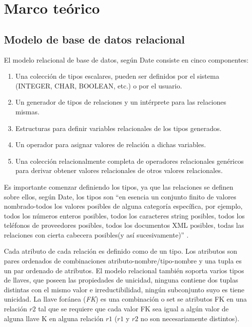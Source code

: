 \documentclass[letterpaper]{article}
\begin{document}
\section {Marco teórico}
\subsection {Modelo de base de datos relacional}
El modelo relacional de base de datos, según Date  consiste en cinco componentes:
\begin{enumerate}
    \item Una colección de tipos escalares, pueden ser definidos por el sistema (INTEGER, CHAR, BOOLEAN, etc.) o por el usuario.
    \item Un generador de tipos de relaciones y un intérprete para las relaciones mismas.
    \item Estructuras para definir variables relacionales de los tipos generados.
    \item Un operador para asignar valores de relación a dichas variables.
    \item Una colección relacionalmente completa de operadores relacionales genéricos para derivar obtener valores relacionales de otros valores relacionales.
\end{enumerate}
Es importante comenzar definiendo los tipos, ya que las relaciones se definen sobre ellos, según Date, los tipos son ``en esencia un conjunto finito de valores nombrado-todos los valores posibles de alguna categoría específica, por ejemplo, todos los números enteros posibles, todos los caracteres string posibles, todos los teléfonos de proveedores posibles, todos los documentos XML posibles, todas las relaciones con cierta cabecera posibles(y así sucesivamente)'' \cite{date12}.

Cada atributo de cada relación es definido como de un tipo. Los atributos son pares ordenados de combinaciones atributo-nombre/tipo-nombre y una tupla es un par ordenado de atributos.
El modelo relacional también soporta varios tipos de llaves, que poseen las propiedades de unicidad, ninguna contiene dos tuplas distintas con el mismo valor e irreductibilidad, ningún subconjunto suyo es tiene unicidad. La llave foránea (\emph{FK}) es una combinación o set se atributos FK en una relación $r2$ tal que se requiere que cada valor FK sea igual a algún valor de alguna llave K en alguna relación $r1$ ($r1$ y $r2$ no son necesariamente distintos).
\end{document}
